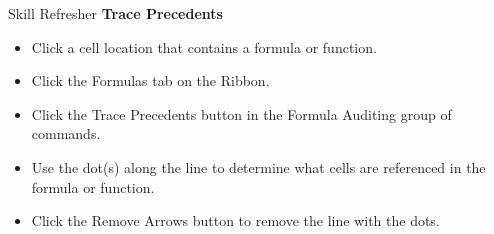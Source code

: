 \begin{center}
	\begin{sklbox}{Skill Refresher}
		\textbf{Trace Precedents}
		\\
		\begin{itemize}
			\setlength{\itemsep}{0pt}
			\setlength{\parskip}{0pt}
			\setlength{\parsep}{0pt}
			
			\item Click a cell location that contains a formula or function.
			\item Click the Formulas tab on the Ribbon.
			\item Click the Trace Precedents button in the Formula Auditing group of commands.
			\item Use the dot(s) along the line to determine what cells are referenced in the formula or function.
			\item Click the Remove Arrows button to remove the line with the dots.
			
		\end{itemize}
	\end{sklbox}
\end{center}

